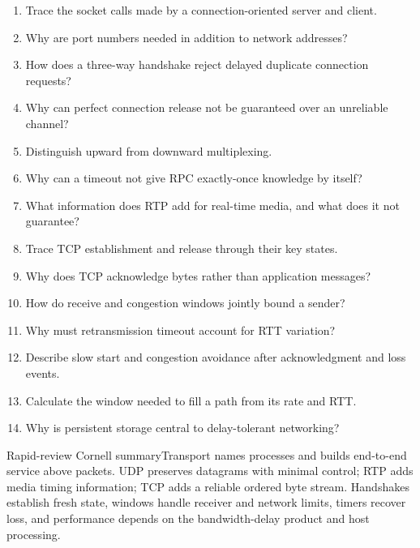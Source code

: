 \documentclass[10pt,letterpaper]{article}
\begin{document}
\begin{enumerate}
  \item Trace the socket calls made by a connection-oriented server and client.
  \item Why are port numbers needed in addition to network addresses?
  \item How does a three-way handshake reject delayed duplicate connection requests?
  \item Why can perfect connection release not be guaranteed over an unreliable channel?
  \item Distinguish upward from downward multiplexing.
  \item Why can a timeout not give RPC exactly-once knowledge by itself?
  \item What information does RTP add for real-time media, and what does it not guarantee?
  \item Trace TCP establishment and release through their key states.
  \item Why does TCP acknowledge bytes rather than application messages?
  \item How do receive and congestion windows jointly bound a sender?
  \item Why must retransmission timeout account for RTT variation?
  \item Describe slow start and congestion avoidance after acknowledgment and loss events.
  \item Calculate the window needed to fill a path from its rate and RTT.
  \item Why is persistent storage central to delay-tolerant networking?
\end{enumerate}
\begin{CornellSummaryBox}{Rapid-review Cornell summary}Transport names processes and builds end-to-end service above packets. UDP preserves datagrams with minimal control; RTP adds media timing information; TCP adds a reliable ordered byte stream. Handshakes establish fresh state, windows handle receiver and network limits, timers recover loss, and performance depends on the bandwidth-delay product and host processing.\end{CornellSummaryBox}
\end{document}

